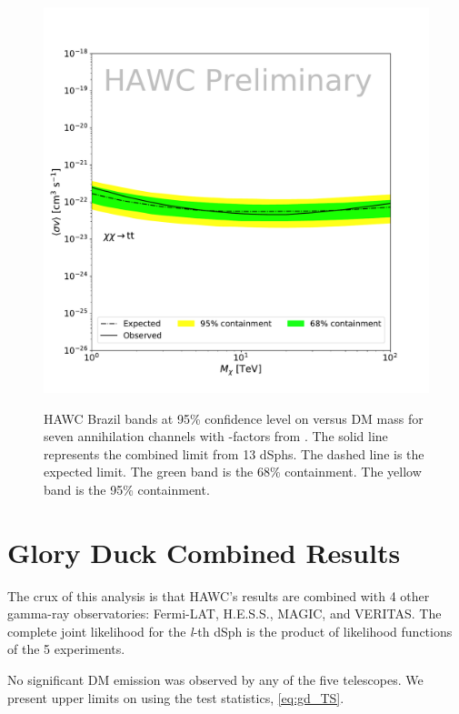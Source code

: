 \begin{figure}[ht]
{    \includegraphics[scale=0.21]{figures/glory_duck/hawc/GD_BrazilBand_tt.pdf}
    }
    \caption{HAWC Brazil bands at 95\% confidence level on \sv versus DM mass for seven annihilation channels with \J-factors from \GS \cite{Geringer-Sameth:2014yza}. The solid line represents the combined limit from 13 dSphs. The dashed line is the expected limit. The green band is the 68\% containment. The yellow band is the 95\% containment.}
\label{fig:hawc_brazil_band}
\end{figure}

\section{Glory Duck Combined Results}\label{sec:results}

The crux of this analysis is that HAWC's results are combined with 4 other gamma-ray observatories: Fermi-LAT, H.E.S.S., MAGIC, and VERITAS.
The complete joint likelihood for the \emph{l}-th dSph is the product of likelihood functions of the 5 experiments.


No significant DM emission was observed by any of the five telescopes.
We present upper limits on \sv using the test statistics, \cref{eq:gd_TS}.

